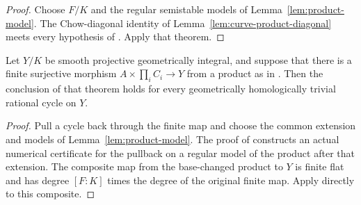 \begin{proof}
Choose $F/K$ and the regular semistable models of
Lemma~\ref{lem:product-model}.  The Chow-diagonal identity of
Lemma~\ref{lem:curve-product-diagonal} meets every hypothesis of
.  Apply that theorem.
\end{proof}

\begin{corollary}
\label{cor:finite-curve-product}
Let $Y/K$ be smooth projective geometrically integral, and
suppose that there is a finite surjective morphism
$A\times\prod_i C_i\to Y$ from a product as in
.  Then the conclusion of that
theorem holds for every geometrically homologically trivial
rational cycle on $Y$.
\end{corollary}

\begin{proof}
Pull a cycle back through the finite map and choose the common
extension and models of Lemma~\ref{lem:product-model}.  The proof
of  constructs an actual
numerical certificate for the pullback on a regular model of
the product after that extension.  The composite map from
the base-changed product to $Y$ is finite flat and has degree
$[F:K]$ times the degree of the original finite map.  Apply
 directly to this composite.
\end{proof}
